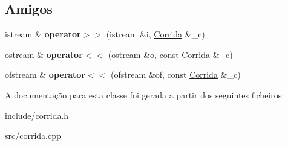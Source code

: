 \subsection*{Amigos}
\begin{DoxyCompactItemize}
\item 
istream \& {\bfseries operator$>$$>$} (istream \&i, \hyperlink{classCorrida}{Corrida} \&\+\_\+c)\hypertarget{classCorrida_ad58195e6a1d5edd9624961d06e0dd845}{}\label{classCorrida_ad58195e6a1d5edd9624961d06e0dd845}

\item 
ostream \& {\bfseries operator$<$$<$} (ostream \&o, const \hyperlink{classCorrida}{Corrida} \&\+\_\+c)\hypertarget{classCorrida_ab387333c5f0a9cf9f8e8f57b45b306b2}{}\label{classCorrida_ab387333c5f0a9cf9f8e8f57b45b306b2}

\item 
ofstream \& {\bfseries operator$<$$<$} (ofstream \&of, const \hyperlink{classCorrida}{Corrida} \&\+\_\+c)\hypertarget{classCorrida_a96147a0930922cbbef0b4b7f6ea5f4fd}{}\label{classCorrida_a96147a0930922cbbef0b4b7f6ea5f4fd}

\end{DoxyCompactItemize}


A documentação para esta classe foi gerada a partir dos seguintes ficheiros\+:\begin{DoxyCompactItemize}
\item 
include/corrida.\+h\item 
src/corrida.\+cpp\end{DoxyCompactItemize}
